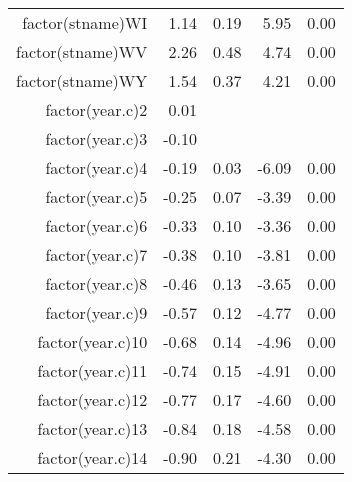\begin{table}[ht]
\begin{tabular}{rrrrr}
  factor(stname)WI & 1.14 & 0.19 & 5.95 & 0.00 \\ 
  factor(stname)WV & 2.26 & 0.48 & 4.74 & 0.00 \\ 
  factor(stname)WY & 1.54 & 0.37 & 4.21 & 0.00 \\ 
  factor(year.c)2 & 0.01 &  &  &  \\ 
  factor(year.c)3 & -0.10 &  &  &  \\ 
  factor(year.c)4 & -0.19 & 0.03 & -6.09 & 0.00 \\ 
  factor(year.c)5 & -0.25 & 0.07 & -3.39 & 0.00 \\ 
  factor(year.c)6 & -0.33 & 0.10 & -3.36 & 0.00 \\ 
  factor(year.c)7 & -0.38 & 0.10 & -3.81 & 0.00 \\ 
  factor(year.c)8 & -0.46 & 0.13 & -3.65 & 0.00 \\ 
  factor(year.c)9 & -0.57 & 0.12 & -4.77 & 0.00 \\ 
  factor(year.c)10 & -0.68 & 0.14 & -4.96 & 0.00 \\ 
  factor(year.c)11 & -0.74 & 0.15 & -4.91 & 0.00 \\ 
  factor(year.c)12 & -0.77 & 0.17 & -4.60 & 0.00 \\ 
  factor(year.c)13 & -0.84 & 0.18 & -4.58 & 0.00 \\ 
  factor(year.c)14 & -0.90 & 0.21 & -4.30 & 0.00 \\ 
   \hline
\end{tabular}
\end{table}
